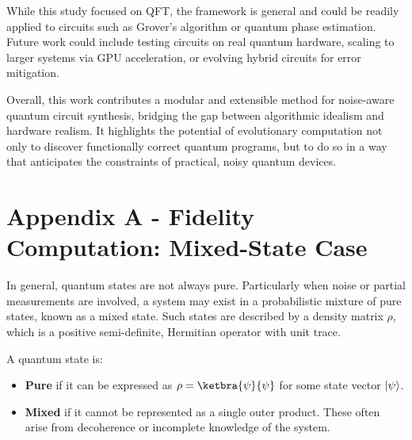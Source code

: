 \documentclass[11pt,a4paper]{article}
\begin{document}
While this study focused on QFT, the framework is general and could be readily applied to circuits such as Grover’s algorithm or quantum phase estimation. Future work could include testing circuits on real quantum hardware, scaling to larger systems via GPU acceleration, or evolving hybrid circuits for error mitigation.\newline

Overall, this work contributes a modular and extensible method for noise-aware quantum circuit synthesis, bridging the gap between algorithmic idealism and hardware realism. It highlights the potential of evolutionary computation not only to discover functionally correct quantum programs, but to do so in a way that anticipates the constraints of practical, noisy quantum devices.\newpage

%
%
\printbibliography

%
%
\newpage

\section*{Appendix A - Fidelity Computation: Mixed-State Case}
\label{appendix:full-fidelity-example}

In general, quantum states are not always pure. Particularly when noise or partial measurements are involved, a system may exist in a probabilistic mixture of pure states, known as a mixed state. Such states are described by a density matrix $\rho$, which is a positive semi-definite, Hermitian operator with unit trace.\newline

\noindent A quantum state is:
\begin{itemize}
    \item \textbf{Pure} if it can be expressed as $\rho = \ketbra{\psi}{\psi}$ for some state vector $\ket{\psi}$.
    \item \textbf{Mixed} if it cannot be represented as a single outer product. These often arise from decoherence or incomplete knowledge of the system.
\end{itemize}
\end{document}
